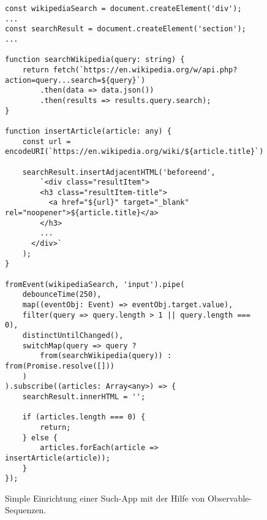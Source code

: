 \begin{figure}[H]
\begin{lstlisting}[basicstyle=\small]
const wikipediaSearch = document.createElement('div');
...
const searchResult = document.createElement('section');
...

function searchWikipedia(query: string) {
    return fetch(`https://en.wikipedia.org/w/api.php?action=query...search=${query}`)
        .then(data => data.json())
        .then(results => results.query.search);
}

function insertArticle(article: any) {
    const url = encodeURI(`https://en.wikipedia.org/wiki/${article.title}`);

    searchResult.insertAdjacentHTML('beforeend',
        `<div class="resultItem">
        <h3 class="resultItem-title">
          <a href="${url}" target="_blank" rel="noopener">${article.title}</a>
        </h3>
        ...
      </div>`
    );
}

fromEvent(wikipediaSearch, 'input').pipe(
    debounceTime(250),
    map((eventObj: Event) => eventObj.target.value),
    filter(query => query.length > 1 || query.length === 0),
    distinctUntilChanged(),
    switchMap(query => query ?
        from(searchWikipedia(query)) : from(Promise.resolve([]))
    )
).subscribe((articles: Array<any>) => {
    searchResult.innerHTML = '';

    if (articles.length === 0) {
        return;
    } else {
        articles.forEach(article => insertArticle(article));
    }
});
\end{lstlisting}
\caption{Simple Einrichtung einer Such-App mit der Hilfe von Observable-Sequenzen.}
\end{figure}

